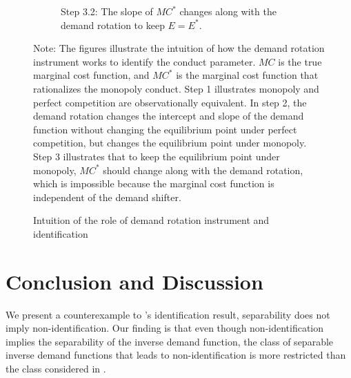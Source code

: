 \documentclass[11pt, a4paper]{article}
\theoremstyle{remark}
\begin{document}
\begin{figure}[p!]
\begin{center}
\begin{subfigure}[b]{0.45\textwidth}
            \caption{Step 3.2: The slope of $MC^{*}$ changes along with the demand rotation to keep $E = E^{*}$.}
            \label{fig:identification_example_step_3_2}
        \end{subfigure}
    \end{center}
    \caption{Intuition of the role of demand rotation instrument and identification}
    \label{fig:identification_example}
    \vspace{2mm}
    \footnotesize
    Note: The figures illustrate the intuition of how the demand rotation instrument works to identify the conduct parameter.
    $MC$ is the true marginal cost function, and $MC^{*}$ is the marginal cost function that rationalizes the monopoly conduct.
    Step 1 illustrates monopoly and perfect competition are observationally equivalent.
    In step 2, the demand rotation changes the intercept and slope of the demand function without changing the equilibrium point under perfect competition, but changes the equilibrium point under monopoly.
    Step 3 illustrates that to keep the equilibrium point under monopoly, $MC^{*}$ should change along with the demand rotation, which is impossible because the marginal cost function is independent of the demand shifter.
\end{figure}







\section{Conclusion and Discussion}

We present a counterexample to \citet{lau1982identifying}'s identification result, separability does not imply non-identification.
Our finding is that even though non-identification implies the separability of the inverse demand function, the class of separable inverse demand functions that leads to non-identification is more restricted than the class considered in \citet{lau1982identifying}.
\end{document}
